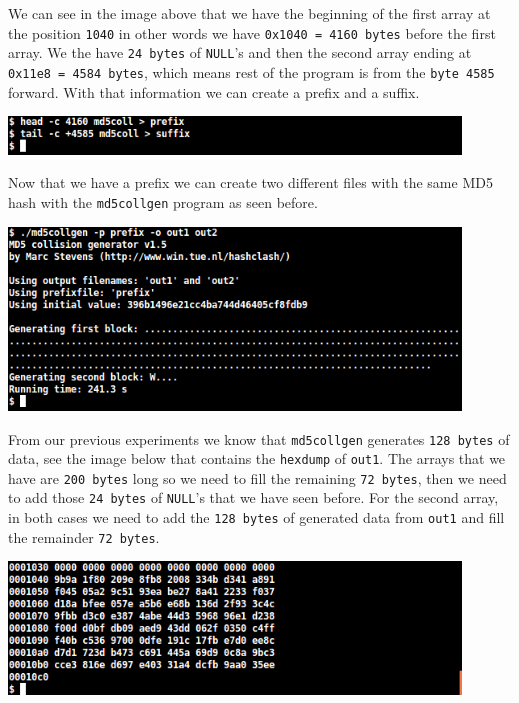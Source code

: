 \documentclass[a4paper]{article}
\begin{document}
\bigskip

We can see in the image above that we have the beginning of the first array at the position \texttt{1040} in other words we have \texttt{0x1040 = 4160 bytes} before the first array. We the have \texttt{24 bytes} of \texttt{NULL}'s and then the second array ending at \texttt{0x11e8 = 4584 bytes}, which means rest of the program is from the \texttt{byte 4585} forward. With that information we can create a prefix and a suffix.

\bigskip

\includegraphics[width=0.9\textwidth]{bash/md5collarraypresuf.png}

\bigskip

Now that we have a prefix we can create two different files with the same MD5 hash with the \texttt{md5collgen} program as seen before.

\bigskip

\includegraphics[width=0.9\textwidth]{bash/md5collarraygenerate.png}

\bigskip

From our previous experiments we know that \texttt{md5collgen} generates \texttt{128 bytes} of data, see the image below that contains the \texttt{hexdump} of \texttt{out1}. The arrays that we have are \texttt{200 bytes} long so we need to fill the remaining \texttt{72 bytes}, then we need to add those \texttt{24 bytes} of \texttt{NULL}'s that we have seen before. For the second array, in both cases we need to add the \texttt{128 bytes} of generated data from \texttt{out1} and fill the remainder \texttt{72 bytes}.

\bigskip

\includegraphics[width=0.9\textwidth]{bash/md5collarrayoutdump.png}
\end{document}
